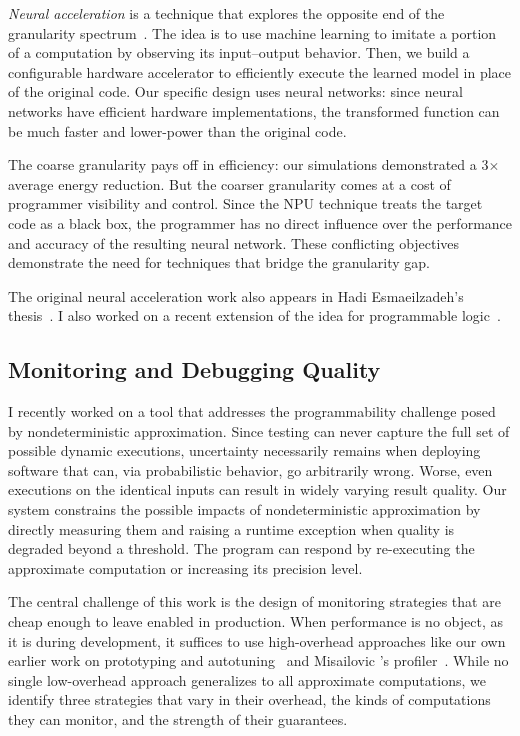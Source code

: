\emph{Neural acceleration} is a technique that explores the opposite end of
the granularity spectrum~\cite{npu, snnap}.
The idea is to use machine learning to imitate a portion of a computation by
observing its input--output behavior.
Then, we build a configurable hardware accelerator to efficiently execute the
learned model in place of the original code.
Our specific design uses neural networks:
since neural networks have
efficient hardware implementations, the transformed function can be much
faster and lower-power than the original code.

The coarse granularity pays off in efficiency: our simulations demonstrated a
3$\times$ average energy reduction.
But the coarser granularity comes at a cost of programmer visibility and
control.
Since the NPU technique treats the target code as a black box, the
programmer has no direct influence over the performance and accuracy of the
resulting neural network.
These conflicting objectives demonstrate the need for techniques that bridge
the granularity gap.

The original neural acceleration work also appears in Hadi Esmaeilzadeh's
thesis~\cite{hadi-thesis}.
I also worked on a recent extension of the idea for programmable
logic~\cite{snnap}.


\subsection{Monitoring and Debugging Quality}

I recently worked on a tool that addresses the programmability challenge posed
by nondeterministic approximation. Since testing can never capture
the full set of possible dynamic executions, uncertainty necessarily remains
when deploying software that can, via probabilistic behavior, go arbitrarily
wrong. Worse, even executions on the identical inputs can result in
widely varying result quality. Our system constrains the possible impacts of
nondeterministic approximation by directly measuring them and raising a
runtime exception when quality is degraded beyond a threshold. The program can
respond by re-executing the approximate computation or increasing its
precision level.

The central challenge of this work is the design of monitoring strategies that
are cheap enough to leave enabled in production. When performance is no object,
as it is during development, it suffices to use high-overhead approaches like our
own earlier work on prototyping and autotuning~\cite{enercaml} and Misailovic
\etal's profiler~\cite{qosprof}.
While no single low-overhead approach
generalizes to all approximate computations, we identify three strategies that
vary in their overhead, the kinds of computations they can monitor, and the
strength of their guarantees.

